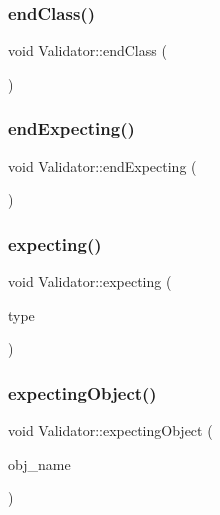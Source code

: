 \mbox{\label{classValidator_a1d31142fe2275fbc9556d1164b01cbfb}} 
\subsubsection{\texorpdfstring{end\+Class()}{endClass()}}
{\footnotesize\ttfamily void Validator\+::end\+Class (\begin{DoxyParamCaption}{ }\end{DoxyParamCaption})}

\mbox{\label{classValidator_adfa1b750001981ae5daa085d32bd626f}} 
\subsubsection{\texorpdfstring{end\+Expecting()}{endExpecting()}}
{\footnotesize\ttfamily void Validator\+::end\+Expecting (\begin{DoxyParamCaption}{ }\end{DoxyParamCaption})}

\mbox{\label{classValidator_a38479b2cec77382e7c25ce898f4d47f9}} 
\subsubsection{\texorpdfstring{expecting()}{expecting()}}
{\footnotesize\ttfamily void Validator\+::expecting (\begin{DoxyParamCaption}\item[{\hyperlink{statics_8h_a0674a913b8e8c8a9f265baab3646b565}{V\+A\+L\+U\+E\+\_\+\+T\+Y\+PE}}]{type }\end{DoxyParamCaption})}

\mbox{\label{classValidator_a6a88dbc8624b8803408094c16a98c205}} 
\subsubsection{\texorpdfstring{expecting\+Object()}{expectingObject()}}
{\footnotesize\ttfamily void Validator\+::expecting\+Object (\begin{DoxyParamCaption}\item[{std\+::string}]{obj\+\_\+name }\end{DoxyParamCaption})}

